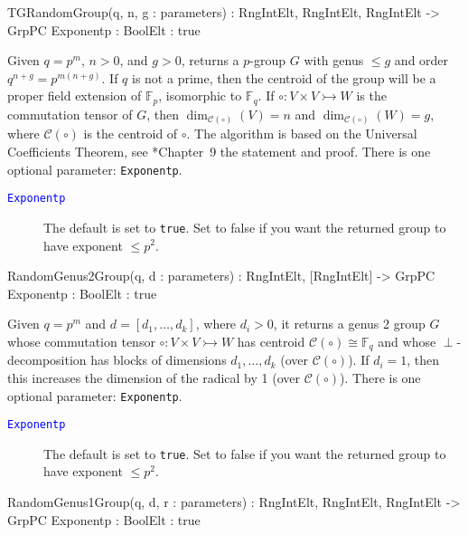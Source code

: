 \documentclass{documentation}
\begin{document}
\begin{intrinsics}
TGRandomGroup(q, n, g : parameters) : RngIntElt, RngIntElt, RngIntElt -> GrpPC
    Exponentp : BoolElt : true
\end{intrinsics}

Given $q=p^m$, $n>0$, and $g>0$, returns a $p$-group $G$ with genus $\leq g$ and order $q^{n+g}=p^{m(n+g)}$. 
If $q$ is not a prime, then the centroid of the group will be a proper field extension of $\mathbb{F}_p$, isomorphic to $\mathbb{F}_q$. 
If $\circ: V\times V\rightarrowtail W$ is the commutation tensor of $G$, then $\dim_{\mathcal{C}(\circ)}(V)=n$ and $\dim_{\mathcal{C}(\circ)}(W)=g$, where $\mathcal{C}(\circ)$ is the centroid of $\circ$. 
The algorithm is based on the Universal Coefficients Theorem, see \cite{LGM:book}*{Chapter~9} the statement and proof.
There is one optional parameter: {\tt Exponentp}. 

\begin{description}
\item[\textcolor{blue}{\tt Exponentp}]
The default is set to {\tt true}.
Set to false if you want the returned group to have exponent $\leq p^2$.  
\end{description}

\begin{intrinsics}
RandomGenus2Group(q, d : parameters) : RngIntElt, [RngIntElt] -> GrpPC
    Exponentp : BoolElt : true
\end{intrinsics}

Given $q=p^m$ and $d=[d_1, \dots, d_k]$, where $d_i>0$, it returns a genus 2 group $G$ whose commutation tensor $\circ : V\times V\rightarrowtail W$ has centroid $\mathcal{C}(\circ)\cong \mathbb{F}_q$ and whose $\perp$-decomposition has blocks of dimensions $d_1,\dots,d_k$ (over $\mathcal{C}(\circ)$).
If $d_i=1$, then this increases the dimension of the radical by 1 (over $\mathcal{C}(\circ)$).
There is one optional parameter: {\tt Exponentp}. 

\begin{description}
\item[\textcolor{blue}{\tt Exponentp}]
The default is set to {\tt true}.
Set to false if you want the returned group to have exponent $\leq p^2$.  
\end{description}

\begin{intrinsics}
RandomGenus1Group(q, d, r : parameters) : RngIntElt, RngIntElt, RngIntElt -> GrpPC
    Exponentp : BoolElt : true
\end{intrinsics}
\end{document}
